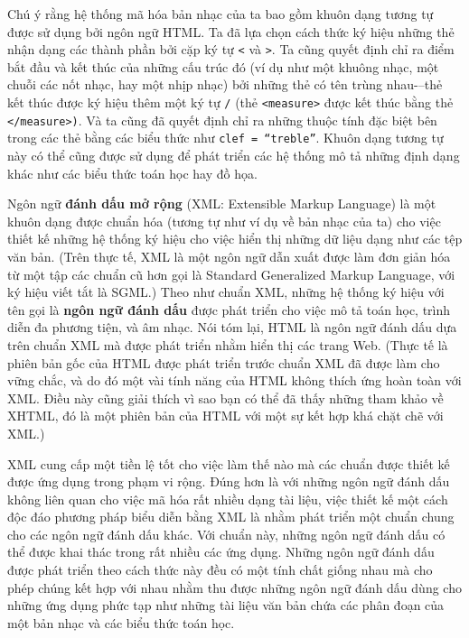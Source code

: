 Chú ý rằng hệ thống mã hóa bản nhạc của ta bao gồm khuôn dạng tương tự được sử dụng bởi
ngôn ngữ HTML. Ta đã lựa chọn cách thức ký hiệu những thẻ nhận dạng các thành phần bởi cặp
ký tự \texttt{<} và \texttt{>}. Ta cũng quyết định chỉ ra điểm bắt đầu và kết thúc của
những cấu trúc đó (ví dụ như một khuông nhạc, một chuỗi các nốt nhạc, hay một nhịp nhạc)
bởi những thẻ có tên trùng nhau-–thẻ kết thúc được ký hiệu thêm một ký tự \texttt{/} (thẻ
\texttt{<measure>} được kết thúc bằng thẻ \texttt{</measure>)}. Và ta cũng đã quyết định
chỉ ra những thuộc tính đặc biệt bên trong các thẻ bằng các biểu thức như \texttt{clef =
  “treble”}. Khuôn dạng tương tự này có thể cũng được sử dụng để phát triển các hệ thống
mô tả những định dạng khác như các biểu thức toán học hay đồ họa.

Ngôn ngữ \textbf{đánh dấu mở rộng} (XML: Extensible Markup Language) là một khuôn dạng
được chuẩn hóa (tương tự như ví dụ về bản nhạc của ta) cho việc thiết kế những hệ
thống ký hiệu cho việc hiển thị những dữ liệu dạng như các tệp văn bản. (Trên thực tế, XML
là một ngôn ngữ dẫn xuất được làm đơn giản hóa từ một tập các chuẩn cũ hơn gọi là Standard
Generalized Markup Language, với ký hiệu viết tắt là SGML.)  Theo như chuẩn XML, những hệ
thống ký hiệu với tên gọi là \textbf{ngôn ngữ đánh dấu} được phát triển cho việc mô tả
toán học, trình diễn đa phương tiện, và âm nhạc. Nói tóm lại, HTML là ngôn ngữ đánh dấu
dựa trên chuẩn XML mà được phát triển nhằm hiển thị các trang Web. (Thực tế là phiên bản
gốc của HTML được phát triển trước chuẩn XML đã được làm cho vững chắc, và do đó một vài
tính năng của HTML không thích ứng hoàn toàn với XML. Điều này cũng giải thích vì sao bạn
có thể đã thấy những tham khảo về XHTML, đó là một phiên bản của HTML với một sự kết hợp
khá chặt chẽ với XML.)

XML cung cấp một tiền lệ tốt cho việc làm thế nào mà các chuẩn được thiết kế được ứng dụng
trong phạm vi rộng. Đúng hơn là với những ngôn ngữ đánh dấu không liên quan cho việc mã
hóa rất nhiều dạng tài liệu, việc thiết kế một cách độc đáo phương pháp biểu diễn bằng XML
là nhằm phát triển một chuẩn chung cho các ngôn ngữ đánh dấu khác. Với chuẩn này, những
ngôn ngữ đánh dấu có thể được khai thác trong rất nhiều các ứng dụng. Những ngôn ngữ đánh
dấu được phát triển theo cách thức này đều có một tính chất giống nhau mà cho phép chúng
kết hợp với nhau nhằm thu được những ngôn ngữ đánh dấu dùng cho những ứng dụng phức tạp
như những tài liệu văn bản chứa các phân đoạn của một bản nhạc và các biểu thức toán học.


